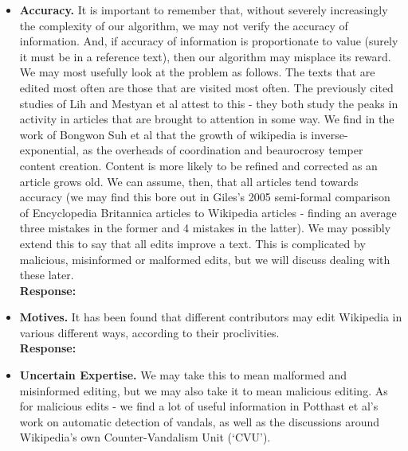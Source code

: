 \documentclass[a4paper,11pt,twoside,notitlepage]{article}
\begin{document}
        \begin{itemize}
          \item \textbf{Accuracy.} It is important to remember that,
            without severely increasingly the complexity of our
            algorithm, we may not verify the accuracy of
            information. And, if accuracy of information is
            proportionate to value (surely it must be in a reference
            text), then our algorithm may misplace its reward. We may
            most usefully look at the problem as follows. The texts that
            are edited most often are those that are visited most
            often. The previously cited studies of Lih and Mestyan et al
            attest to this - they both study the peaks in activity in
            articles that are brought to attention in some way. We
            find in the work of Bongwon Suh et al that the growth of
            wikipedia is inverse-exponential, as the overheads of
            coordination and beaurocrosy temper content
            creation.\cite{Suh2009}\cite{Kittur2007} Content is more
            likely to be refined and corrected as an article grows
            old.\cite{Wilkinson2007} We can assume, then, that all
            articles tend towards accuracy (we may find this bore out
            in Giles's 2005 semi-formal comparison of Encyclopedia
            Britannica articles to Wikipedia articles - finding an
            average three mistakes in the former and 4 mistakes in the
            latter)\cite{Giles2005}. We may possibly extend this to
            say that all edits improve a text. This is complicated by
            malicious, misinformed or malformed edits, but we will
            discuss dealing with these later.\\
            \textbf{Response:}
          \item \textbf{Motives.} It has been found that different
            contributors may edit Wikipedia in various different ways,
            according to their proclivities.\\
            \textbf{Response:}
          \item \textbf{Uncertain Expertise.} We may take this to mean
            malformed and misinformed editing, but we may also take it
            to mean malicious editing. As for malicious edits - we
            find a lot of useful information in Potthast et al's work
            on automatic detection of vandals,\cite{Potthast2008} as
            well as the discussions around Wikipedia's own
            Counter-Vandalism Unit (`CVU').\cite{wiki-vandalism}

\end{itemize}
\end{document}
